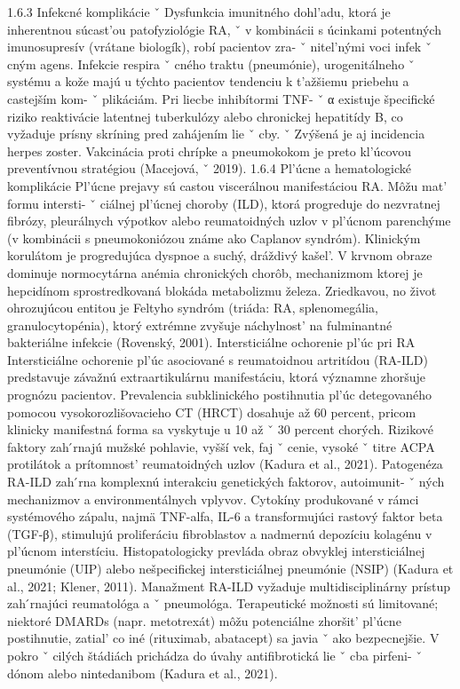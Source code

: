 { 1.6.3 Infekcné komplikácie ˇ Dysfunkcia imunitného dohl’adu, ktorá je inherentnou súcast’ou patofyziológie RA, ˇ v kombinácii s úcinkami potentných imunosupresív (vrátane biologík), robí pacientov zra- ˇ nitel’nými voci infek ˇ cným agens. Infekcie respira ˇ cného traktu (pneumónie), urogenitálneho ˇ systému a kože majú u týchto pacientov tendenciu k t’ažšiemu priebehu a castejším kom- ˇ plikáciám. Pri liecbe inhibítormi TNF- ˇ α existuje špecifické riziko reaktivácie latentnej tuberkulózy alebo chronickej hepatitídy B, co vyžaduje prísny skríning pred zahájením lie ˇ cby. ˇ Zvýšená je aj incidencia herpes zoster. Vakcinácia proti chrípke a pneumokokom je preto kl’úcovou preventívnou stratégiou (Macejová, ˇ 2019).
 1.6.4 Pl’úcne a hematologické komplikácie Pl’úcne prejavy sú castou viscerálnou manifestáciou RA. Môžu mat’ formu intersti- ˇ ciálnej pl’úcnej choroby (ILD), ktorá progreduje do nezvratnej fibrózy, pleurálnych výpotkov alebo reumatoidných uzlov v pl’úcnom parenchýme (v kombinácii s pneumokoniózou známe ako Caplanov syndróm). Klinickým korulátom je progredujúca dyspnoe a suchý, dráždivý kašel’. V krvnom obraze dominuje normocytárna anémia chronických chorôb, mechanizmom ktorej je hepcidínom sprostredkovaná blokáda metabolizmu železa. Zriedkavou, no život ohrozujúcou entitou je Feltyho syndróm (triáda: RA, splenomegália, granulocytopénia), ktorý extrémne zvyšuje náchylnost’ na fulminantné bakteriálne infekcie (Rovenský, 2001).
 Intersticiálne ochorenie pl’úc pri RA Intersticiálne ochorenie pl’úc asociované s reumatoidnou artritídou (RA-ILD) predstavuje závažnú extraartikulárnu manifestáciu, ktorá významne zhoršuje prognózu pacientov.
 Prevalencia subklinického postihnutia pl’úc detegovaného pomocou vysokorozlišovacieho CT (HRCT) dosahuje až 60 percent, pricom klinicky manifestná forma sa vyskytuje u 10 až ˇ 30 percent chorých. Rizikové faktory zah ́rnajú mužské pohlavie, vyšší vek, faj ˇ cenie, vysoké ˇ titre ACPA protilátok a prítomnost’ reumatoidných uzlov (Kadura et al., 2021).
 Patogenéza RA-ILD zah ́rna komplexnú interakciu genetických faktorov, autoimunit- ˇ ných mechanizmov a environmentálnych vplyvov. Cytokíny produkované v rámci systémového zápalu, najmä TNF-alfa, IL-6 a transformujúci rastový faktor beta (TGF-β), stimulujú proliferáciu fibroblastov a nadmernú depozíciu kolagénu v pl’úcnom interstíciu. Histopatologicky prevláda obraz obvyklej intersticiálnej pneumónie (UIP) alebo nešpecifickej intersticiálnej pneumónie (NSIP) (Kadura et al., 2021; Klener, 2011).
 Manažment RA-ILD vyžaduje multidisciplinárny prístup zah ́rnajúci reumatológa a ˇ pneumológa. Terapeutické možnosti sú limitované; niektoré DMARDs (napr. metotrexát) môžu potenciálne zhoršit’ pl’úcne postihnutie, zatial’ co iné (rituximab, abatacept) sa javia ˇ ako bezpecnejšie. V pokro ˇ cilých štádiách prichádza do úvahy antifibrotická lie ˇ cba pirfeni- ˇ dónom alebo nintedanibom (Kadura et al., 2021).
}
